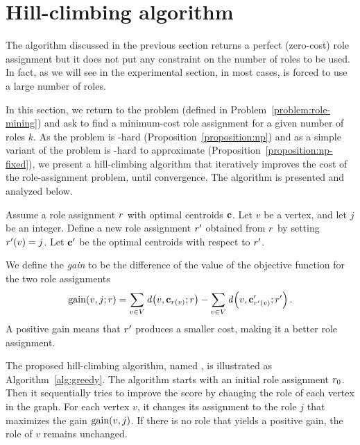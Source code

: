 \section{Hill-climbing algorithm}
\label{section:greedy}

The algorithm discussed in the previous section
returns a perfect (zero-cost) role assignment
but it does not put any constraint on the number of roles to be used.
In fact, as we will see in the experimental section, 
in most cases, \algperfect is forced to use a large number of roles. 

In this section, we return to the \prbrm problem
(defined in Problem~\ref{problem:role-mining})
and ask to find a minimum-cost role assignment
for a given number of roles $k$.
As the \prbrm problem is \np-hard (Proposition~\ref{proposition:np}) and
as a simple variant of the problem is \np-hard to approximate (Proposition~\ref{proposition:np-fixed}), 
we present a hill-climbing algorithm
that iteratively improves the cost of the role-assignment problem, 
until convergence.
The algorithm is presented and analyzed below.

Assume a role assignment $r$ with optimal centroids $\mathbf{c}$. 
Let $v$ be a vertex, and let $j$ be an integer.
Define a new role assignment $r'$ obtained from $r$ by setting $r'(v) = j$.
Let $\mathbf{c}'$ be the optimal centroids with respect to $r'$.

We define the \emph{gain} to be the difference
of the value of the objective function for the two role assignments 
\[
\gain{v, j; \role} = 
	\sum_{v \in V} \dist{v, \centroid_{\role(v)}; \role} - \sum_{v \in V} \dist{v, \centroid'_{\role'(v)}; \role'}.
\]
A positive gain means that $r'$ produces a smaller cost, making it a better role assignment.

\iffalse
i -> j
\[
	- c_i\norm{\centroid_i}^2 + (c_i - 1)\norm{\centroid_i'}^2
	+ c_j\norm{\centroid_j}^2 - (c_i + 1)\norm{\centroid_j'}^2
\]

\[
	+ \prof{w}_i^2  -  (\prof{w}_i - 1)^2
	- \prof{w}_j^2  +  (\prof{w}_j - 1)^2
\]

\[
	2\prof{w}_i - 2\prof{w}_j 
\]

\[
	-c_\ell ((\centroid_\ell)^2_i - (\centroid_\ell')^2_i
	-(\centroid_\ell)^2_j + (\centroid_\ell')^2_j)
\]

\[
	- 2(\centroid_\ell)_i  + 2(\centroid_\ell)_j  
\]
\fi

The proposed hill-climbing algorithm,
named \alggreedy, 
is illustrated as Algorithm~\ref{alg:greedy}. 
The algorithm starts with an initial role assignment ${r}_{0}$.
Then it sequentially tries to improve the score by changing the role of each vertex in the graph.
For each vertex $v$, it changes its assignment to the role $j$
that maximizes the gain $\gain{v, j}$. 
If there is no role that yields a positive gain, 
the role of $v$ remains unchanged.

